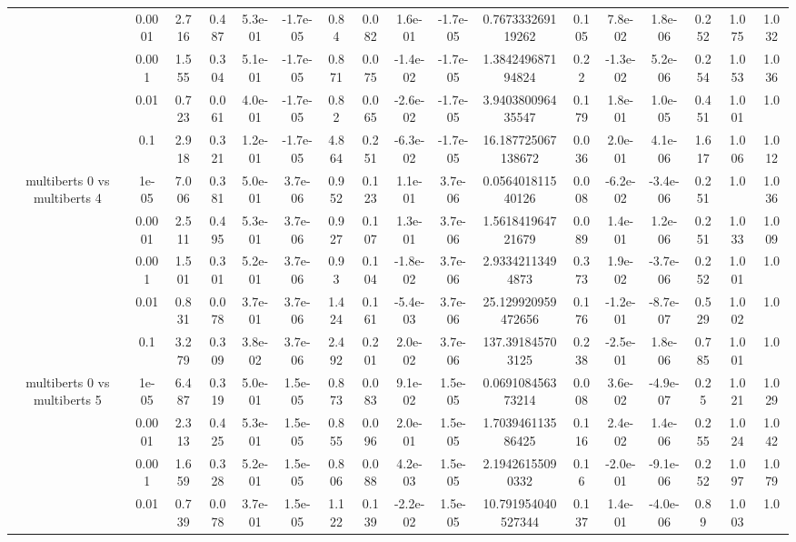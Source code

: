 \begin{tabular}{|c|c|c|c|c|c|c|c|c|c|c|c|c|c|c|c|c|}
 & 0.0001 & 2.716 & 0.487 & 5.3e-01 & -1.7e-05 & 0.84 & 0.082 & 1.6e-01 & -1.7e-05 & 0.767333269119262 & 0.105 & 7.8e-02 & 1.8e-06 & 0.252 & 1.075 & 1.032 \\
 & 0.001 & 1.555 & 0.304 & 5.1e-01 & -1.7e-05 & 0.871 & 0.075 & -1.4e-02 & -1.7e-05 & 1.384249687194824 & 0.22 & -1.3e-02 & 5.2e-06 & 0.254 & 1.053 & 1.036 \\
 & 0.01 & 0.723 & 0.061 & 4.0e-01 & -1.7e-05 & 0.82 & 0.065 & -2.6e-02 & -1.7e-05 & 3.940380096435547 & 0.179 & 1.8e-01 & 1.0e-05 & 0.451 & 1.001 & 1.0 \\
 & 0.1 & 2.918 & 0.321 & 1.2e-01 & -1.7e-05 & 4.864 & 0.251 & -6.3e-02 & -1.7e-05 & 16.187725067138672 & 0.036 & 2.0e-01 & 4.1e-06 & 1.617 & 1.006 & 1.012 \\
\hline
\multirow{5}{*}{multiberts 0 vs multiberts 4} & 1e-05 & 7.006 & 0.381 & 5.0e-01 & 3.7e-06 & 0.952 & 0.123 & 1.1e-01 & 3.7e-06 & 0.056401811540126 & 0.008 & -6.2e-02 & -3.4e-06 & 0.251 & 1.0 & 1.036 \\
 & 0.0001 & 2.511 & 0.495 & 5.3e-01 & 3.7e-06 & 0.927 & 0.107 & 1.3e-01 & 3.7e-06 & 1.561841964721679 & 0.089 & 1.4e-01 & 1.2e-06 & 0.251 & 1.033 & 1.009 \\
 & 0.001 & 1.501 & 0.301 & 5.2e-01 & 3.7e-06 & 0.93 & 0.104 & -1.8e-02 & 3.7e-06 & 2.93342113494873 & 0.373 & 1.9e-02 & -3.7e-06 & 0.252 & 1.001 & 1.0 \\
 & 0.01 & 0.831 & 0.078 & 3.7e-01 & 3.7e-06 & 1.424 & 0.161 & -5.4e-03 & 3.7e-06 & 25.129920959472656 & 0.176 & -1.2e-01 & -8.7e-07 & 0.529 & 1.002 & 1.0 \\
 & 0.1 & 3.279 & 0.309 & 3.8e-02 & 3.7e-06 & 2.492 & 0.201 & 2.0e-02 & 3.7e-06 & 137.391845703125 & 0.238 & -2.5e-01 & 1.8e-06 & 0.785 & 1.001 & 1.0 \\
\hline
\multirow{5}{*}{multiberts 0 vs multiberts 5} & 1e-05 & 6.487 & 0.319 & 5.0e-01 & 1.5e-05 & 0.873 & 0.083 & 9.1e-02 & 1.5e-05 & 0.069108456373214 & 0.008 & 3.6e-02 & -4.9e-07 & 0.25 & 1.021 & 1.029 \\
 & 0.0001 & 2.313 & 0.425 & 5.3e-01 & 1.5e-05 & 0.855 & 0.096 & 2.0e-01 & 1.5e-05 & 1.703946113586425 & 0.116 & 2.4e-02 & 1.4e-06 & 0.255 & 1.024 & 1.042 \\
 & 0.001 & 1.659 & 0.328 & 5.2e-01 & 1.5e-05 & 0.806 & 0.088 & 4.2e-03 & 1.5e-05 & 2.19426155090332 & 0.16 & -2.0e-01 & -9.1e-06 & 0.252 & 1.097 & 1.079 \\
 & 0.01 & 0.739 & 0.078 & 3.7e-01 & 1.5e-05 & 1.122 & 0.139 & -2.2e-02 & 1.5e-05 & 10.791954040527344 & 0.137 & 1.4e-01 & -4.0e-06 & 0.89 & 1.003 & 1.0 \\

\end{tabular}
